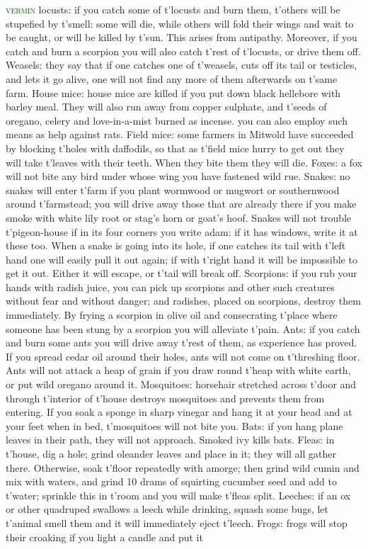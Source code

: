 \documentclass[twoside,11pt,b5paper,twocolumn]{scrbook}
\newcommand{\estcab}[1]{\textsc{\textcolor{marron}{#1}}}
\renewcommand{\paragraph}[1]{\par\noindent\markboth{#1}{#1}\estcab{\textcolor{darkgreen}{#1}}\label{#1} }
\begin{document}
\paragraph{vermin} locusts: if you catch some of t'locusts and burn them, t'others will be stupefied by t'smell: some will die, while others will fold their wings and wait to be caught, or will be killed by t'sun. This arises from antipathy. Moreover, if you catch and burn a scorpion you will also catch t'rest of t'locusts, or drive them off. Weasels: they say that if one catches one of t'weasels, cuts off its tail or testicles, and lets it go alive, one will not find any more of them afterwards on t'same farm. House mice: house mice are killed if you put down black hellebore with barley meal. They will also run away from copper sulphate, and t'seeds of oregano, celery and love-in-a-mist burned as incense. you can also employ such means as help against rats. Field mice: some farmers in Mitwold have succeeded by blocking t'holes with daffodils, so that as t'field mice hurry to get out they will take t'leaves with their teeth. When they bite them they will die. Foxes: a fox will not bite any bird under whose wing you have fastened wild rue. Snakes: no snakes will enter t'farm if you plant wormwood or mugwort or southernwood around t'farmstead; you will drive away those that are already there if you make smoke with white lily root or stag’s horn or goat’s hoof. Snakes will not trouble t'pigeon-house if in its four corners you write adam: if it has windows, write it at these too. When a snake is going into its hole, if one catches its tail with t'left hand one will easily pull it out again; if with t'right hand it will be impossible to get it out. Either it will escape, or t'tail will break off. Scorpions: if you rub your hands with radish juice, you can pick up scorpions and other such creatures without fear and without danger; and radishes, placed on scorpions, destroy them immediately. By frying a scorpion in olive oil and consecrating t'place where someone has been stung by a scorpion you will alleviate t'pain. Ants: if you catch and burn some ants you will drive away t'rest of them, as experience has proved. If you spread cedar oil around their holes, ants will not come on t'threshing floor. Ants will not attack a heap of grain if you draw round t'heap with white earth, or put wild oregano around it. Mosquitoes: horsehair stretched across t'door and through t'interior of t'house destroys mosquitoes and prevents them from entering. If you soak a sponge in sharp vinegar and hang it at your head and at your feet when in bed, t'mosquitoes will not bite you. Bats: if you hang plane leaves in their path, they will not approach. Smoked ivy kills bats. Fleas: in t'house, dig a hole; grind oleander leaves and place in it; they will all gather there. Otherwise, soak t'floor repeatedly with amorge; then grind wild cumin and mix with waters, and grind 10 drams of squirting cucumber seed and add to t'water; sprinkle this in t'room and you will make t'fleas split. Leeches: if an ox or other quadruped swallows a leech while drinking, squash some bugs, let t'animal smell them and it will immediately eject t'leech. Frogs: frogs will stop their croaking if you light a candle and put it 
\end{document}
